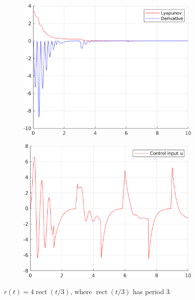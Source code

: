 \documentclass[12pt,a4paper]{article}
\begin{document}
\begin{figure}[H]
\begin{subfigure}{.45\textwidth}
				\includegraphics[width=1\textwidth]{Graphics/LinearLyapunov4.png}
			\end{subfigure}%
			\begin{subfigure}{.45\textwidth}
				\centering
				\includegraphics[width=1\textwidth]{Graphics/LinearControl4.png}
			\end{subfigure}
		\caption{$r(t) = 4\operatorname{rect}(t/3)$, where $\operatorname{rect}(t/3)$ has period $3$}
		\label{fig:rect2}
		\end{figure}
	 
\end{document}
